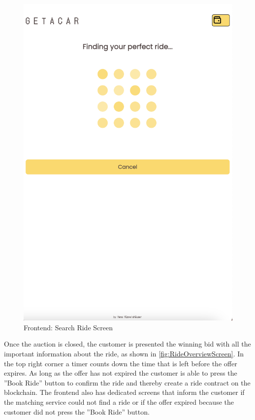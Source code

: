\begin{figure}[H]
\begin{minipage}{0.45\linewidth}
        \includegraphics[width=\linewidth]{data/ffss/4.png}
        \caption{Frontend: Search Ride Screen}
        \label{fig:SearchRideScreen}
    \end{minipage}
    
\end{figure}

Once the auction is closed, the customer is presented the winning bid with all the important information about the ride, as shown in \ref{fig:RideOverviewScreen}. In the top right corner a timer counts down the time that is left before the offer expires. As long as the offer has not expired the customer is able to press the ''Book Ride'' button to confirm the ride and thereby create a ride contract on the blockchain. The frontend also has dedicated screens that inform the customer if the matching service could not find a ride or if the offer expired because the customer did not press the ''Book Ride'' button.

